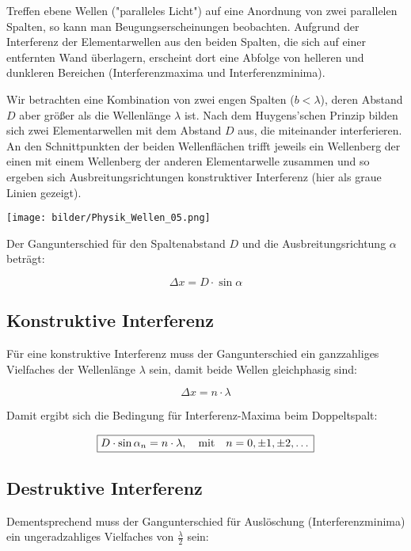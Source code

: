     Treffen ebene Wellen ("paralleles Licht") auf eine Anordnung von zwei parallelen Spalten, so kann man Beugungserscheinungen beobachten. Aufgrund der Interferenz der Elementarwellen aus den beiden Spalten, die sich auf einer entfernten Wand überlagern, erscheint dort eine Abfolge von helleren und dunkleren Bereichen (Interferenzmaxima und Interferenzminima).

    Wir betrachten eine Kombination von zwei engen Spalten ($b < \lambda$), deren Abstand $D$ aber größer als die Wellenlänge $\lambda$ ist. Nach dem Huygens’schen Prinzip bilden sich zwei Elementarwellen mit dem Abstand $D$ aus, die miteinander interferieren. An den Schnittpunkten der beiden Wellenflächen trifft jeweils ein Wellenberg der einen mit einem Wellenberg der anderen Elementarwelle zusammen und so ergeben sich Ausbreitungsrichtungen konstruktiver Interferenz (hier als graue Linien gezeigt).

    \begin{center}
        \texttt{[image: bilder/Physik\_Wellen\_05.png]}
    \end{center}

    Der Gangunterschied für den Spaltenabstand $D$ und die Ausbreitungsrichtung $\alpha$ beträgt:

    $$\Delta x = D \cdot \sin \alpha$$

    \subsection{Konstruktive Interferenz}

        Für eine konstruktive Interferenz muss der Gangunterschied ein ganzzahliges Vielfaches der Wellenlänge $\lambda$ sein, damit beide Wellen gleichphasig sind:

        $$\Delta x = n \cdot \lambda$$
        
        Damit ergibt sich die Bedingung für Interferenz-Maxima beim Doppeltspalt:
        
        $$\fbox{$D \cdot \sin \alpha_{n} = n \cdot \lambda, \quad \text{mit} \quad n = 0, \pm 1, \pm 2, \dots$}$$
    
    \subsection{Destruktive Interferenz}

        Dementsprechend muss der Gangunterschied für Auslöschung (Interferenzminima) ein ungeradzahliges Vielfaches von $\frac{\lambda}{2}$ sein:

